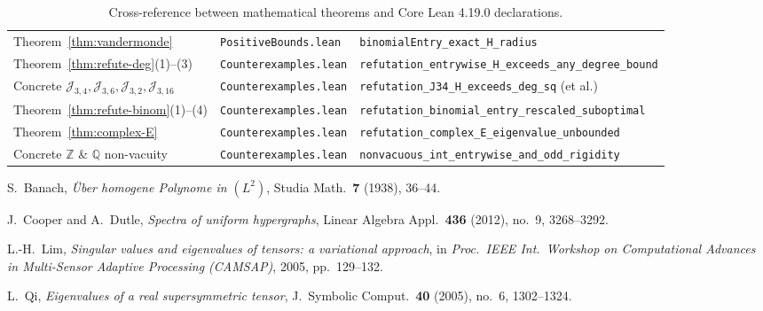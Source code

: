 \documentclass[11pt]{article}
\theoremstyle{definition}
\newcommand{\Q}{\mathbb{Q}}
\newcommand{\Z}{\mathbb{Z}}
\newcommand{\cJ}{\mathcal{J}}
\begin{document}
\begin{table}[ht]
\begin{tabular}{@{}lll@{}}
Theorem~\ref{thm:vandermonde} & \texttt{PositiveBounds.lean} & \texttt{binomialEntry\_exact\_H\_radius} \\
Theorem~\ref{thm:refute-deg}(1)--(3) & \texttt{Counterexamples.lean} & \texttt{refutation\_entrywise\_H\_exceeds\_any\_degree\_bound} \\
Concrete $\cJ_{3,4}, \cJ_{3,6}, \cJ_{3,2}, \cJ_{3,16}$ & \texttt{Counterexamples.lean} & \texttt{refutation\_J34\_H\_exceeds\_deg\_sq} (et al.) \\
Theorem~\ref{thm:refute-binom}(1)--(4) & \texttt{Counterexamples.lean} & \texttt{refutation\_binomial\_entry\_rescaled\_suboptimal} \\
Theorem~\ref{thm:complex-E} & \texttt{Counterexamples.lean} & \texttt{refutation\_complex\_E\_eigenvalue\_unbounded} \\
Concrete $\Z$ \& $\Q$ non-vacuity & \texttt{Counterexamples.lean} & \texttt{nonvacuous\_int\_entrywise\_and\_odd\_rigidity} \\
\bottomrule
\end{tabular}
\caption{Cross-reference between mathematical theorems and Core Lean 4.19.0 declarations.}
\label{tab:lean-xref}
\end{table}

\begin{thebibliography}{9}
S.~Banach,
\emph{\"Uber homogene Polynome in $(L^2)$},
Studia Math.\ \textbf{7} (1938), 36--44.

J.~Cooper and A.~Dutle,
\emph{Spectra of uniform hypergraphs},
Linear Algebra Appl.\ \textbf{436} (2012), no.~9, 3268--3292.

L.-H.~Lim,
\emph{Singular values and eigenvalues of tensors: a variational approach},
in \emph{Proc.\ IEEE Int.\ Workshop on Computational Advances in Multi-Sensor Adaptive Processing (CAMSAP)},
2005, pp.~129--132.

L.~Qi,
\emph{Eigenvalues of a real supersymmetric tensor},
J.~Symbolic Comput.\ \textbf{40} (2005), no.~6, 1302--1324.
\end{thebibliography}
\end{document}
